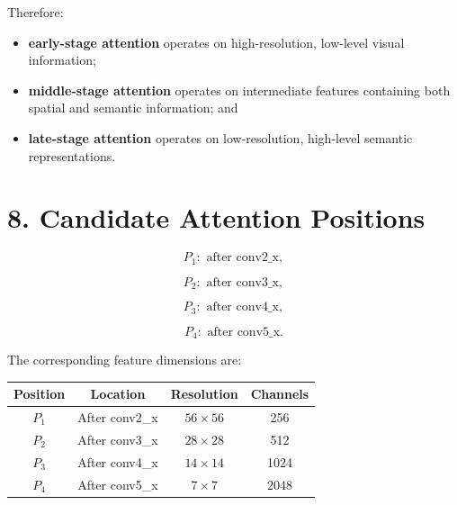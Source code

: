 \documentclass[10pt]{article}
\begin{document}
Therefore:

\begin{itemize}

\item \textbf{early-stage attention} operates on high-resolution,
low-level visual information;

\item \textbf{middle-stage attention} operates on intermediate features
containing both spatial and semantic information; and

\item \textbf{late-stage attention} operates on low-resolution,
high-level semantic representations.

\end{itemize}

\section*{8. Candidate Attention Positions}

\[
P_1:
\text{ after conv2\_x},
\]

\[
P_2:
\text{ after conv3\_x},
\]

\[
P_3:
\text{ after conv4\_x},
\]

\[
P_4:
\text{ after conv5\_x}.
\]

The corresponding feature dimensions are:

\begin{center}

\begin{tabular}{|c|c|c|c|}
\hline

\textbf{Position}
&
\textbf{Location}
&
\textbf{Resolution}
&
\textbf{Channels}
\\
\hline

$P_1$
&
After conv2\_x
&
$56\times56$
&
256
\\
\hline

$P_2$
&
After conv3\_x
&
$28\times28$
&
512
\\
\hline

$P_3$
&
After conv4\_x
&
$14\times14$
&
1024
\\
\hline

$P_4$
&
After conv5\_x
&
$7\times7$
&
2048
\\
\hline

\end{tabular}

\end{center}
\end{document}
